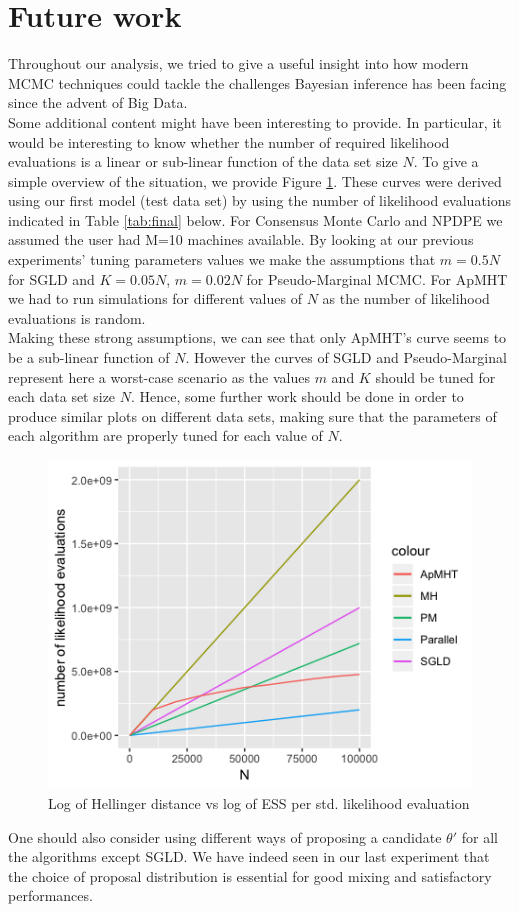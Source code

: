 \documentclass[11pt,a4paper]{report}\usepackage[]{graphicx}\usepackage[]{color}
\begin{document}
\section*{Future work}
Throughout our analysis, we tried to give a useful insight into how modern MCMC techniques could tackle the challenges Bayesian inference has been facing since the advent of Big Data. \\
Some additional content might have been interesting to provide. In particular, it would be interesting to know whether the number of required likelihood evaluations is a linear or sub-linear function of the data set size $N$. To give a simple overview of the situation, we provide Figure \ref{plot:final}. These curves were derived using our first model (test data set) by using the number of likelihood evaluations indicated in Table \ref{tab:final} below. For Consensus Monte Carlo and NPDPE we assumed the user had M=10 machines available. By looking at our previous experiments' tuning parameters values we make the assumptions that $m=0.5N$ for SGLD and $K=0.05N$, $m=0.02N$ for Pseudo-Marginal MCMC. For ApMHT we had to run simulations for different values of $N$ as the number of likelihood evaluations is random.\\
Making these strong assumptions, we can see that only ApMHT's curve seems to be a sub-linear function of $N$. However the curves of SGLD and Pseudo-Marginal represent here a worst-case scenario as the values $m$ and $K$ should be tuned for each data set size $N$. Hence, some further work should be done in order to produce similar plots on different data sets, making sure that the parameters of each algorithm are properly tuned for each value of $N$.
\begin{figure}[H]
\caption{Log of Hellinger distance vs log of ESS per std. likelihood evaluation}
\label{plot:final}
\centering

  \includegraphics[resolution=110]{final_plot.png}

\end{figure}
One should also consider using different ways of proposing a candidate $\theta'$ for all the algorithms except SGLD. We have indeed seen in our last experiment that the choice of proposal distribution is essential for good mixing and satisfactory performances.\\
\end{document}
